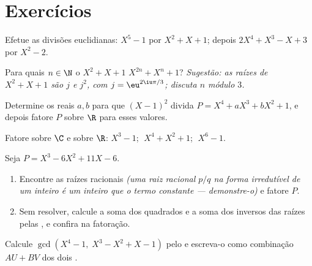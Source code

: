 \section{Exercícios}

\begin{exercise}[$\star$]\label{exo:b1:poly:1}
Efetue as divisões euclidianas: $X^5 - 1$ por $X^2 + X + 1$; depois
$2X^4 + X^3 - X + 3$ por $X^2 - 2$.
\end{exercise}

\begin{exercise}[$\star$]\label{exo:b1:poly:2}
Para quais $n \in \N$ o  $X^2 + X + 1$  $X^{2n} + X^n + 1$?
\emph{Sugestão: as raízes de $X^2 + X + 1$ são $j$ e $j^2$, com $j =
\eu^{2\iu\pi/3}$; discuta $n$ módulo $3$.}
\end{exercise}

\begin{exercise}[$\star$]\label{exo:b1:poly:3}
Determine os reais $a, b$ para que $(X-1)^2$ divida $P = X^4 + aX^3 +
bX^2 + 1$, e depois fatore $P$ sobre $\R$ para esses valores.
\end{exercise}

\begin{exercise}[$\star$]\label{exo:b1:poly:4}
Fatore sobre $\C$ e sobre $\R$: $X^3 - 1$; $\;X^4 + X^2 + 1$;
$\;X^6 - 1$.
\end{exercise}

\begin{exercise}[$\star\star$]\label{exo:b1:poly:5}
Seja $P = X^3 - 6X^2 + 11X - 6$.
\begin{enumerate}
  \item Encontre as raízes racionais \emph{(uma raiz racional $p/q$ na
        forma irredutível de um  inteiro  é um inteiro
        que  o termo constante --- demonstre-o)} e fatore $P$.
  \item Sem resolver, calcule a soma dos quadrados e a soma
        dos inversos das raízes pelas , e confira na
        fatoração.
\end{enumerate}
\end{exercise}

\begin{exercise}[$\star\star$]\label{exo:b1:poly:6}
Calcule $\gcd(X^4 - 1,\; X^3 - X^2 + X - 1)$ pelo  e
escreva-o como combinação $AU + BV$ dos dois .
\end{exercise}

